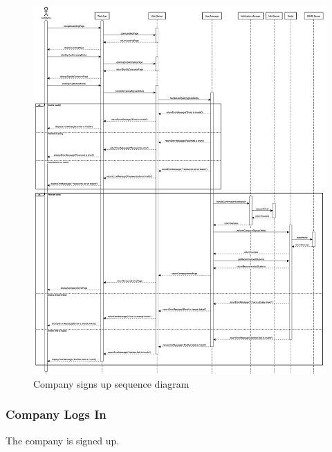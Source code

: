 \begin{figure}[h!]
    \centering
    \includegraphics[width=14cm]{images/sequence-diagrams/company-signs-up.png}
    \caption{Company signs up sequence diagram}
\end{figure}

\newpage
\subsubsection{Company Logs In}
The company is signed up.

